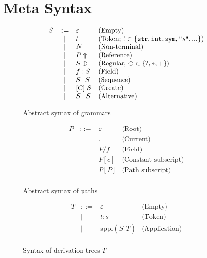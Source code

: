 \documentclass[preprint,10pt]{sigplanconf}
\begin{document}


\section{Meta Syntax}

\def\literal#1{\ensuremath{\text{\texttt{"}}#1\text{\texttt{"}}}}

\begin{figure}
\[
\begin{array}{rcll}
S & ::= & \varepsilon & \text{(Empty)} \\
  & \mid & t & \text{(Token; } t\in\{\text{\texttt{str}}, \text{\texttt{int}}, \text{\texttt{sym}}, \literal{s},... \}\text{)} \\
  & \mid & N & \text{(Non-terminal)}\\
  & \mid & P\Uparrow & \text{(Reference)}\\
  & \mid & S\;\oplus & \text{(Regular; }\oplus\in\{?,*,+\}\text{)}\\ 
  & \mid & f:S & \text{(Field)}\\
  & \mid & S\cdot S & \text{(Sequence)}\\
  & \mid & [C]\; S & \text{(Create)}\\
  & \mid & S \mid S & \text{(Alternative)}\\
\end{array}
\]
\caption{Abstract syntax of \enso grammars\label{FIG:metasyntax}}
\end{figure}


\begin{figure}
\[
\begin{array}{rcll}
P & ::= & \varepsilon & \text{(Root)}\\
  & \mid & . & \text{(Current)}\\
  & \mid & P / f & \text{(Field)}\\
  & \mid & P [c] & \text{(Constant subscript)}\\
  & \mid & P [P] & \text{(Path subscript)}\\
\end{array}
\]
\caption{Abstract syntax of paths\label{FIG:pathsyntax}}
\end{figure}

\begin{figure}
\[
\begin{array}{rcll}
T & ::=  &\varepsilon & \text{(Empty)}\\
  & \mid & t: s & \text{(Token)}\\
  & \mid & \text{appl}(S, \overline{T}) & \text{(Application)}\\
\end{array}
\]
\caption{Syntax of derivation trees $T$\label{FIG:derivation}}
\end{figure}
\end{document}

